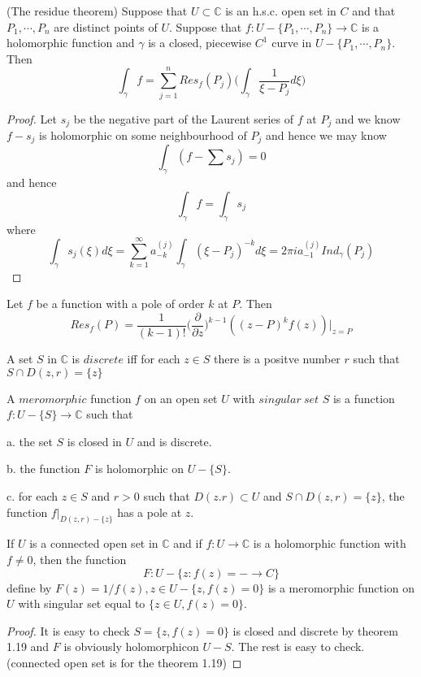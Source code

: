 \documentclass[lang=en, color=blue, ]{elegantbook}
\newcommand{\C}{\mathbb{C}}
\newcommand{\ParZ}{\dfrac{\partial}{\partial z}}
\begin{document}
\begin{theorem}
    (The residue theorem) Suppose that $U\subset \C$ is an h.s.c. open set in $C$ and that $P_1,\cdots,P_n$ are distinct points of $U$. Suppose that $f:U-\{P_1,\cdots,P_n\}\to\C$ is a holomorphic function and $\gamma$ is a closed, piecewise $C^1$ curve in $U-\{P_1,\cdots,P_n\}$. Then
    \[
    \int_{\gamma}f = \sum\limits_{j=1}^n Res_f(P_j)\Big(\int_{\gamma}\dfrac{1}{\xi-P_j}d\xi\Big)
    \]
\end{theorem}
\begin{proof}\par
    Let $s_j$ be the negative part of the Laurent series of $f$ at $P_j$ and we know $f-s_j$ is holomorphic on some neighbourhood of $P_j$ and hence we may know 
    \[
    \int_{\gamma} (f-\sum s_j) = 0
    \]
    and hence
    \[\int_{\gamma} f = \int_{\gamma} s_j\]
    where
    \[\int_{\gamma}s_j(\xi)d\xi = \sum_{k=1}^{\infty} a_{-k}^{(j)}\int_{\gamma}(\xi-P_j)^{-k}d\xi = 2\pi i a_{-1}^{(j)}Ind_{\gamma}(P_j)\]
\end{proof}

\begin{proposition}
    Let $f$ be a function with a pole of order $k$ at $P$. Then
    \[
    Res_f(P) = \dfrac{1}{(k-1)!}\Big(\ParZ\Big)^{k-1} ((z-P)^kf(z))|_{z=P}
    \]
\end{proposition}

\begin{definition}
    A set $S$ in $\C$ is $discrete$ iff for each $z\in S$ there is a positve number $r$ such that $S\cap D(z,r) = \{z\}$
\end{definition}

\begin{definition}
    A $meromorphic$ function $f$ on an open set $U$ with $singular\ set$ $S$ is a function $f:U-\{S\} \to \C$ such that\par
    a. the set $S$ is closed in $U$ and is discrete.\par
    b. the function $F$ is holomorphic on $U-\{S\}$.\par
    c. for each $z\in S$ and $r>0$ such that $D(z.r)\subset U$ and $S\cap D(z,r)= \{z\}$, the function $f|_{D(z,r)-\{z\}}$ has a pole at $z$.
\end{definition}

\begin{lemma}
    If $U$ is a connected open set in $\C$ and if $f:U\to\C$ is a holomorphic function with $f\neq 0$, then the function
    \[F:U-\{z:f(z)=-\to C\}\]
    define by $F(z) = 1/f(z), z\in U-\{z,f(z) = 0\}$ is a meromorphic function on $U$ with singular set equal to $\{z\in U, f(z) = 0\}$.
\end{lemma}
\begin{proof}
    It is easy to check $S = \{z,f(z) = 0\}$ is closed and discrete by theorem 1.19 and $F$ is obviously holomorphicon $U-S$. The rest is easy to check.(connected open set is for the theorem 1.19)
\end{proof}
\end{document}
